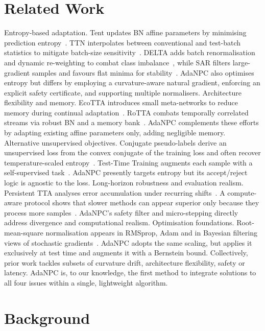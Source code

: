 \documentclass{article} %
\begin{document}
\section{Related Work}\label{sec:related}
Entropy-based adaptation. Tent updates BN affine parameters by minimising prediction entropy~\cite{wang-2020-tent}. TTN interpolates between conventional and test-batch statistics to mitigate batch-size sensitivity~\cite{lim-2023-ttn}. DELTA adds batch renormalisation and dynamic re-weighting to combat class imbalance~\cite{zhao-2023-delta}, while SAR filters large-gradient samples and favours flat minima for stability~\cite{niu-2023-towards}. AdaNPC also optimises entropy but differs by employing a curvature-aware natural gradient, enforcing an explicit safety certificate, and supporting multiple normalisers.
Architecture flexibility and memory. EcoTTA introduces small meta-networks to reduce memory during continual adaptation~\cite{song-2023-ecotta}. RoTTA combats temporally correlated streams via robust BN and a memory bank~\cite{yuan-2023-robust}. AdaNPC complements these efforts by adapting existing affine parameters only, adding negligible memory.
Alternative unsupervised objectives. Conjugate pseudo-labels derive an unsupervised loss from the convex conjugate of the training loss and often recover temperature-scaled entropy~\cite{goyal-2022-test}. Test-Time Training augments each sample with a self-supervised task~\cite{sun-2019-test}. AdaNPC presently targets entropy but its accept/reject logic is agnostic to the loss.
Long-horizon robustness and evaluation realism. Persistent TTA analyses error accumulation under recurring shifts~\cite{hoang-2023-persistent}. A compute-aware protocol shows that slower methods can appear superior only because they process more samples~\cite{alfarra-2023-evaluation}. AdaNPC's safety filter and micro-stepping directly address divergence and computational realism.
Optimisation foundations. Root-mean-square normalisation appears in RMSprop, Adam and in Bayesian filtering views of stochastic gradients~\cite{aitchison-2018-bayesian}. AdaNPC adopts the same scaling, but applies it exclusively at test time and augments it with a Bernstein bound.
Collectively, prior work tackles subsets of curvature drift, architecture flexibility, safety or latency. AdaNPC is, to our knowledge, the first method to integrate solutions to all four issues within a single, lightweight algorithm.

\section{Background}\label{sec:background}
\end{document}
